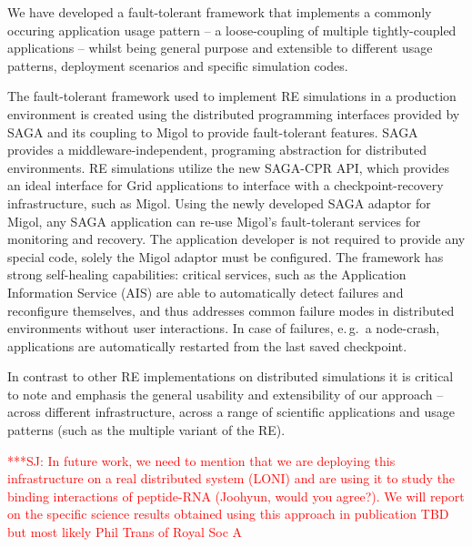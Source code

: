 \documentclass[times, 10pt, twocolumn]{article}
\newcommand{\jhanote}[1]{ {\textcolor{red} { ***SJ: #1 }}}
\newcommand{\jhanote}[1]{}
\newcommand{\up}{\vspace*{-1em}}
\begin{document}

\up
We have developed a fault-tolerant framework that implements a
commonly occuring application usage pattern -- a loose-coupling of
multiple tightly-coupled applications -- whilst being general purpose
and extensible to different usage patterns, deployment scenarios and
specific simulation codes.

The fault-tolerant framework used to implement RE simulations in a
production environment is created using the distributed programming
interfaces provided by SAGA and its coupling to Migol to provide
fault-tolerant features.  SAGA provides a middleware-independent,
programing abstraction for distributed environments. RE simulations
utilize the new SAGA-CPR API, which provides an ideal interface for
Grid applications to interface with a checkpoint-recovery
infrastructure, such as Migol. Using the newly developed SAGA adaptor
for Migol, any SAGA application can re-use Migol's fault-tolerant
services for monitoring and recovery.  The application developer is
not required to provide any special code, solely the Migol adaptor
must be configured.  The framework has strong self-healing
capabilities: critical services, such as the Application Information
Service (AIS) are able to automatically detect failures and
reconfigure themselves, and thus addresses common failure modes in
distributed environments without user interactions.
In case of failures, e.\,g.\ a node-crash, applications are
automatically restarted from the last saved
checkpoint. %

In contrast to other RE implementations on distributed
simulations it is critical to note and emphasis the general usability
and extensibility of our approach -- across different infrastructure,
across a range of scientific applications and usage patterns (such as
the multiple variant of the RE).

\jhanote{In future work, we need to mention that we are deploying this
  infrastructure on a real distributed system (LONI) and are using it
  to study the binding interactions of peptide-RNA (Joohyun, would you
  agree?). We will report on the specific science results obtained
  using this approach in publication TBD but most likely Phil Trans of
  Royal Soc A}
\end{document}
